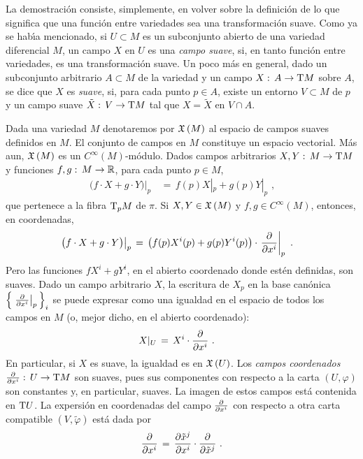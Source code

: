 La demostraci\'{o}n consiste, simplemente, en volver sobre la definici\'{o}n
de lo que significa que una funci\'{o}n entre variedades sea una
transformaci\'{o}n suave. Como ya se hab\'{\i}a mencionado, si
$U\subset M$ es un subconjunto abierto de una variedad diferencial $M$,
un campo $X$ en $U$ es una \emph{campo suave}, si, en tanto funci\'{o}n
entre variedades, es una transformaci\'{o}n suave. Un poco m\'{a}s en general,
dado un subconjunto arbitrario $A\subset M$ de la variedad y un campo
$X:\,A\rightarrow\tangente{M}$ sobre $A$, se dice que $X$ es \emph{suave},
si, para cada punto $p\in A$, existe un entorno $V\subset M$ de $p$ y un
campo suave $\tilde{X}:\,V\rightarrow\tangente{M}$ tal que $X=\tilde{X}$
en $V\cap A$.

Dada una variedad $M$ denotaremos por $\mathfrak{X}\left(M\right)$ al espacio de
campos suaves definidos en $M$. El conjunto de campos en $M$ constituye un
espacio vectorial. M\'{a}s aun, $\mathfrak{X}\left(M\right)$ es un $C^{\infty}(M)$-m\'{o}dulo.
Dados campos arbitrarios $X,Y:\,M\rightarrow\tangente{M}$ y funciones
$f,g:\,M\rightarrow\mathbb{R}$, para cada punto $p\in M$,
\begin{align*}
	\left.\big(f\cdot X+g\cdot Y\big)\right|_{p} & \,=\,
		f(p)X|_{p}+g(p)Y|_{p}
	\text{ ,}
\end{align*}
%
que pertenece a la fibra $\tangente[p]{M}$ de $\pi$. Si $X,Y\in\mathfrak{X}\left(M\right)$ y
$f,g\in C^{\infty}(M)$, entonces, en coordenadas,
\begin{align*}
	\left.\big(f\cdot X+g\cdot Y\big)\right|_{p} & \,=\,
		\big(f(p)X^{i}(p)+g(p)Y^{i}(p)\big)\cdot\gancho[p]{x^{i}}
	\text{ .}
\end{align*}
%
Pero las funciones $fX^{i}+gY^{i}$, en el abierto coordenado donde est\'{e}n
definidas, son \phantom{continuas} suaves. Dado un campo arbitrario
$X$, la escritura de $X_{p}$ en la base can\'{o}nica
$\Big\{\gancho[p]{x^{i}}\Big\}_{i}$ se puede expresar como una igualdad
en el espacio de todos los campos en $M$ (o, mejor dicho, en el abierto
coordenado):
\begin{align*}
	X|_{U} & \,=\, X^{i}\cdot\gancho{x^{i}}
	\text{ .}
\end{align*}
%
En particular, si $X$ es suave, la igualdad es en $\mathfrak{X}\left(U\right)$. Los
\emph{campos coordenados} $\gancho{x^{i}}:\,U\rightarrow\tangente{M}$
son suaves, pues sus componentes con respecto a la carta $(U,\varphi)$ son
constantes y, en particular, suaves. La imagen de estos campos est\'{a}
contenida en $\tangente{U}$. La expersi\'{o}n en coordenadas del campo
$\gancho{x^{i}}$ con respecto a otra carta compatible $(V,\tilde{\varphi})$
est\'{a} dada por
\begin{equation}
	\label{eq:cambiodeganchos}
	\gancho{x^{i}} \,=\,\derivada{\tilde{x}^{j}}{x^{i}}\cdot
		\gancho{\tilde{x}^{j}}
	\text{ .}
\end{equation}
%

